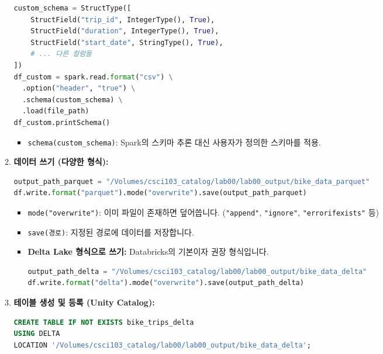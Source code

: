 \documentclass[11pt,a4paper]{article}
\begin{document}
\begin{itemize}
\begin{enumerate}
\begin{lstlisting}[language=python, caption={스키마 수동 정의 예시}]
custom_schema = StructType([
    StructField("trip_id", IntegerType(), True),
    StructField("duration", IntegerType(), True),
    StructField("start_date", StringType(), True),
    # ... 다른 컬럼들
])
df_custom = spark.read.format("csv") \
  .option("header", "true") \
  .schema(custom_schema) \
  .load(file_path)
df_custom.printSchema()
        \end{lstlisting}
        \begin{itemize}
            \item \texttt{schema(custom_schema)}: Spark의 스키마 추론 대신 사용자가 정의한 스키마를 적용.
        \end{itemize}
    \item \textbf{데이터 쓰기 (다양한 형식):}
        \begin{lstlisting}[language=python, caption={데이터를 Parquet 형식으로 쓰기 예시}]
output_path_parquet = "/Volumes/csci103_catalog/lab00/lab00_output/bike_data_parquet"
df.write.format("parquet").mode("overwrite").save(output_path_parquet)
        \end{lstlisting}
        \begin{itemize}
            \item \texttt{mode("overwrite")}: 이미 파일이 존재하면 덮어씁니다. (\texttt{"append"}, \texttt{"ignore"}, \texttt{"errorifexists"} 등)
            \item \texttt{save(경로)}: 지정된 경로에 데이터를 저장합니다.
            \item \textbf{Delta Lake 형식으로 쓰기:} Databricks의 기본이자 권장 형식입니다.
                \begin{lstlisting}[language=python, caption={데이터를 Delta 형식으로 쓰기 예시}]
output_path_delta = "/Volumes/csci103_catalog/lab00/lab00_output/bike_data_delta"
df.write.format("delta").mode("overwrite").save(output_path_delta)
                \end{lstlisting}
        \end{itemize}
    \item \textbf{테이블 생성 및 등록 (Unity Catalog):}
        \begin{lstlisting}[language=sql, caption={Delta 테이블 생성 및 등록 예시}]
%sql
CREATE TABLE IF NOT EXISTS bike_trips_delta
USING DELTA
LOCATION '/Volumes/csci103_catalog/lab00/lab00_output/bike_data_delta';


\end{lstlisting}
\end{enumerate}
\end{itemize}
\end{document}
